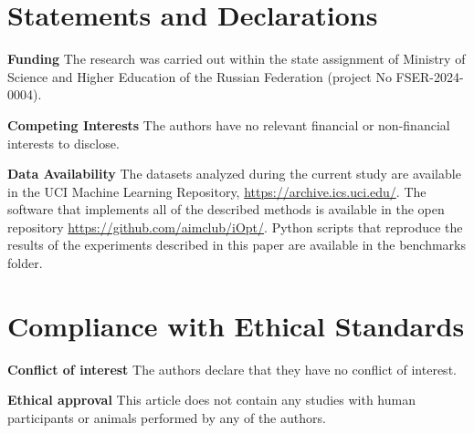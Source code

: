 \documentclass[iicol]{sn-jnl}
\theoremstyle{thmstyleone}%
\theoremstyle{thmstyletwo}%
\theoremstyle{thmstylethree}%
\begin{document}
\section*{Statements and Declarations}

\textbf{Funding} The research was carried out within the state assignment of Ministry of Science and Higher Education of the Russian Federation (project No FSER-2024-0004).

\noindent
\textbf{Competing Interests} The authors have no relevant financial or non-financial interests to disclose.

\noindent
\textbf{Data Availability} 
The datasets analyzed during the current study are available in the UCI Machine Learning Repository, \url{https://archive.ics.uci.edu/}. 
The software that implements all of the described methods is available in the open repository \url{https://github.com/aimclub/iOpt/}.
Python scripts that reproduce the results of the experiments described in this paper are available in the benchmarks folder.


\section*{Compliance with Ethical Standards}

\textbf{Conflict of interest} The authors declare that they have no conflict of interest.

\noindent
\textbf{Ethical approval} This article does not contain any studies with human participants or animals performed by any of the authors.





\end{document}
